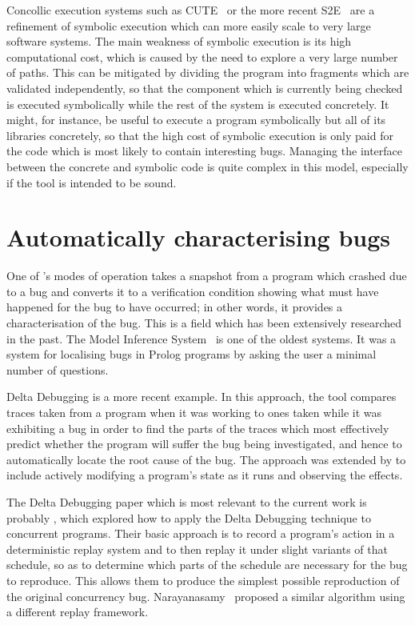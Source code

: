 Concollic execution systems such as CUTE~\cite{Sen2005} or the more
recent S2E~\cite{Chipounov2009} are a refinement of symbolic execution
which can more easily scale to very large software systems.  The main
weakness of symbolic execution is its high computational cost, which
is caused by the need to explore a very large number of paths.  This
can be mitigated by dividing the program into fragments which are
validated independently, so that the component which is currently
being checked is executed symbolically while the rest of the system is
executed concretely.  It might, for instance, be useful to execute a
program symbolically but all of its libraries concretely, so that the
high cost of symbolic execution is only paid for the code which is
most likely to contain interesting bugs.  Managing the interface
between the concrete and symbolic code is quite complex in this model,
especially if the tool is intended to be sound.  

\nocite{Andrews2004}

\section{Automatically characterising bugs}
\label{sect:rw:auto_characterise}

One of {\implementation}'s modes of operation takes a snapshot from a
program which crashed due to a bug and converts it to a verification
condition showing what must have happened for the bug to have
occurred; in other words, it provides a characterisation of the bug.
This is a field which has been extensively researched in the past.
The Model Inference System~\cite{Shapiro1982} is one of the oldest
systems.  It was a system for localising bugs in Prolog programs by
asking the user a minimal number of questions.

Delta Debugging\cite{Cleve2005} is a more recent example.  In this
approach, the tool compares traces taken from a program when it was
working to ones taken while it was exhibiting a bug in order to find
the parts of the traces which most effectively predict whether the
program will suffer the bug being investigated, and hence to
automatically locate the root cause of the bug.  The approach was
extended by \cite{Jeffrey2009} to include actively
modifying a program's state as it runs and observing the effects.

The Delta Debugging paper which is most relevant to the current work
is probably \cite{Choi2002}, which explored how to apply the Delta
Debugging technique to concurrent programs.  Their basic approach is
to record a program's action in a deterministic replay system and to
then replay it under slight variants of that schedule, so as to
determine which parts of the schedule are necessary for the bug to
reproduce.  This allows them to produce the simplest possible
reproduction of the original concurrency bug.  
Narayanasamy~\cite{Narayanasamy2007} proposed a similar algorithm
using a different replay framework.

